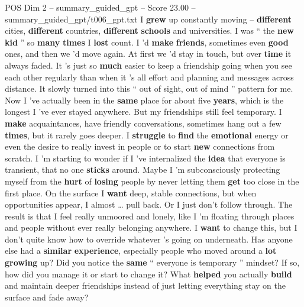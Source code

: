 \begin{textsample}{POS Dim 2 – summary\_guided\_gpt – Score 23.00 – summary\_guided\_gpt/t006\_gpt.txt}  \label{ex:f2_pos_012}
I \textbf{grew} up constantly moving – \textbf{different} cities, \textbf{different} countries, \textbf{different} \textbf{schools} and universities.
I was “ the \textbf{new} \textbf{kid} ” so \textbf{many} \textbf{times} I \textbf{lost} count.
I ’d \textbf{make} \textbf{friends}, sometimes even \textbf{good} ones, and then we ’d move again.
At first we ’d stay in touch, but over \textbf{time} it always faded.
It ’s just so \textbf{much} easier to keep a friendship going when you see each other regularly than when it ’s all effort and planning and messages across distance.
It slowly turned into this “ out of sight, out of mind ” pattern for me.
Now I ’ve actually been in the \textbf{same} place for about five \textbf{years}, which is the longest I ’ve ever stayed anywhere.
But my friendships still feel temporary.
I \textbf{make} acquaintances, have friendly conversations, sometimes hang out a few \textbf{times}, but it rarely goes deeper.
I \textbf{struggle} to \textbf{find} the \textbf{emotional} energy or even the desire to really invest in people or to start \textbf{new} connections from scratch.
I ’m starting to wonder if I ’ve internalized the \textbf{idea} that everyone is transient, that no one \textbf{sticks} around.
Maybe I ’m subconsciously protecting myself from the \textbf{hurt} of \textbf{losing} people by never letting them \textbf{get} too close in the first place.
On the surface I \textbf{want} deep, stable connections, but when opportunities appear, I almost … pull back.
Or I just don't follow through.
The result is that I feel really unmoored and lonely, like I ’m floating through places and people without ever really belonging anywhere.
I \textbf{want} to change this, but I don't quite know how to override whatever ’s going on underneath.
Has anyone else had a \textbf{similar} \textbf{experience}, especially people who moved around a \textbf{lot} \textbf{growing} up?
Did you notice the \textbf{same} “ everyone is temporary ” mindset?
If so, how did you manage it or start to change it?
What \textbf{helped} you actually \textbf{build} and maintain deeper friendships instead of just letting everything stay on the surface and fade away?

\end{textsample}
